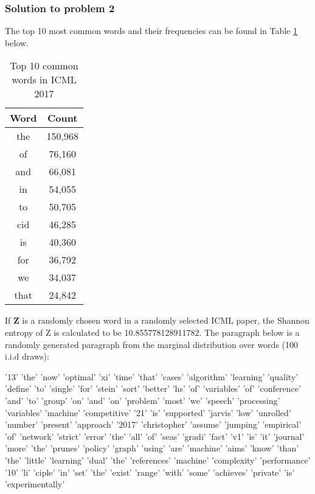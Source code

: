\documentclass[12pt]{article}%
\begin{document}
\subsubsection{Solution to problem 2}
 
The top 10 most common words and their frequencies can be found in Table \ref{table:Q2} below. 

\begin{table}[h]
\centering
\begin{tabular}{|c|c|}
\hline
\textbf{Word} & \textbf{Count} \\ \hline
the           & 150,968         \\ \hline
of            & 76,160          \\ \hline
and           & 66,081          \\ \hline
in            & 54,055          \\ \hline
to            & 50,705          \\ \hline
cid           & 46,285          \\ \hline
is            & 40,360          \\ \hline
for           & 36,792          \\ \hline
we            & 34,037          \\ \hline
that          & 24,842          \\ \hline
\end{tabular}
\caption{Top 10 common words in ICML 2017}
\label{table:Q2}
\end{table}

If \textbf{Z} is a randomly chosen word in a randomly selected ICML paper, the Shannon entropy of Z is calculated to be 10.855778128911782. The paragraph below is a randomly generated paragraph from the marginal distribution over words (100 i.i.d draws):

\begin{displayquote}
'13' 'the' 'now' 'optimal' 'xi' 'time' 'that' 'cases' 'algorithm' 'learning' 'quality' 'deﬁne' 'to' 'single' 'for' 'stein' 'sort' 'better' 'hs' 'of' 'variables' 'of' 'conference' 'and' 'to' 'group' 'on' 'and' 'on' 'problem' 'most' 'we' 'speech' 'processing' 'variables' 'machine' 'competitive' '21' 'is' 'supported' 'jarvis' 'low' 'unrolled' 'number' 'present' 'approach' '2017' 'christopher' 'assume' 'jumping' 'empirical'  'of' 'network' 'strict' 'error' 'the' 'all' 'of'  'seas' 'gradi' 'fact' 'v1' 'is' 'it' 'journal' 'more' 'the' 'prunes' 'policy' 'graph' 'using' 'are' 'machine' 'aims' 'know' 'than' 'the' 'little' 'learning' 'dual' 'the' 'references' 'machine' 'complexity' 'performance' '10' 'li' 'ciple' 'in' 'set' 'the' 'exist' 'range' 'with' 'some' 'achieves' 'private' 'is' 'experimentally'
\end{displayquote}
\end{document}
